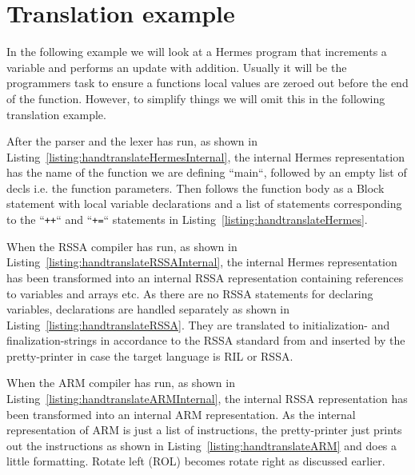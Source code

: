 \section{Translation example}
In the following example we will look at a Hermes program that increments a variable and performs an update with addition.
Usually it will be the programmers task to ensure a functions local values are zeroed out before the end of the function. However, to simplify  things we will omit this in the following translation example.

After the parser and the lexer has run, as shown in Listing~\ref{listing:handtranslateHermesInternal}, the internal Hermes representation has the name of the function we are defining ``main``, followed by an empty list of decls i.e. the function parameters.
Then follows the function body as a Block statement with local variable declarations and a list of statements corresponding to the ``\lstinline{++}`` and ``\lstinline{+=}`` statements in Listing~\ref{listing:handtranslateHermes}.

When the RSSA compiler has run, as shown in Listing~\ref{listing:handtranslateRSSAInternal}, the internal Hermes representation has been transformed into an internal RSSA representation containing references to variables and arrays etc.
As there are no RSSA statements for declaring variables, declarations are handled separately as shown in Listing~\ref{listing:handtranslateRSSA}. They are translated to initialization- and finalization-strings in accordance to the RSSA standard from\cite{10.1007/978-3-319-41579-6_16} and inserted by the pretty-printer in case the target language is RIL or RSSA.

When the ARM compiler has run, as shown in Listing~\ref{listing:handtranslateARMInternal}, the internal RSSA representation has been transformed into an internal ARM representation.
As the internal representation of ARM is just a list of instructions, the pretty-printer just prints out the instructions as shown in Listing~\ref{listing:handtranslateARM} and does a little formatting. Rotate left (ROL) becomes rotate right as discussed earlier.





